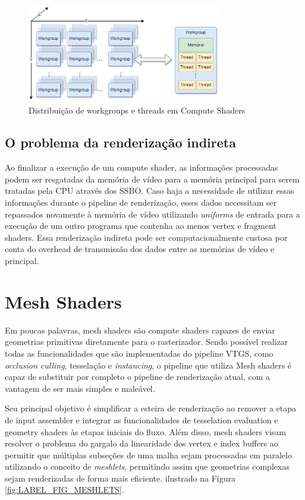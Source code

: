 \begin{figure}
  \centering
  \includegraphics[width=0.75\textwidth]{imagens/WorkgroupsVisualisation2.drawio.png}
  \caption{Distribuição de workgroups e threads em Compute Shaders}
  \label{fig:LABEL_FIG_WORKGROUPS}
\end{figure}

\subsection{O problema da renderização indireta}\label{sec:LABEL_RENDERIZACAO_INDIRETA}

Ao finalizar a execução de um compute shader, as informações processadas podem ser resgatadas da memória de vídeo para a memória principal para serem tratadas pela CPU através dos SSBO. Caso haja a necessidade de utilizar essas informações durante o pipeline de renderização, esses dados necessitam ser repassados novamente à memória de vídeo utilizando \textit{uniforms} de entrada para a execução de um outro programa que contenha ao menos vertex e fragment shaders. Essa renderização indireta pode ser computacionalmente custosa por conta do overhead de transmissão dos dados entre as memórias de vídeo e principal.

\section{Mesh Shaders}\label{sec:LABEL_CHP_1_SEC_D}

Em poucas palavras, mesh shaders são compute shaders capazes de enviar geometrias primitivas diretamente para o rasterizador. Sendo possível realizar todas as funcionalidades que são implementadas do pipeline VTGS, como \textit{occlusion culling}, tesselação e \textit{instancing}, o pipeline que utiliza Mesh shaders é capaz de substituir por completo o pipeline de renderização atual, com a vantagem de ser mais simples e maleável.

Seu principal objetivo é simplificar a esteira de renderização ao remover a etapa de input assembler e integrar as funcionalidades de tesselation evaluation e geometry shaders às etapas iniciais do fluxo. Além disso, mesh shaders visam resolver o problema do gargalo da linearidade dos vertex e index buffers ao permitir que múltiplas subseções de uma malha sejam processadas em paralelo utilizando o conceito de \textit{meshlets}, permitindo assim que geometrias complexas sejam renderizadas de forma mais eficiente. ilustrado na Figura \ref{fig:LABEL_FIG_MESHLETS}.

